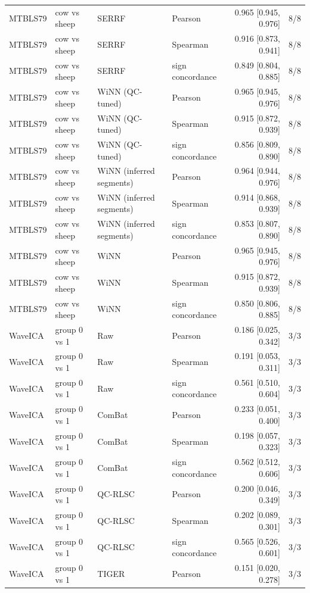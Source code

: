 \begin{landscape}
\begin{longtable}{llllrr}
MTBLS79 & cow vs sheep & SERRF & Pearson & 0.965 [0.945, 0.976] & 8/8 \\
MTBLS79 & cow vs sheep & SERRF & Spearman & 0.916 [0.873, 0.941] & 8/8 \\
MTBLS79 & cow vs sheep & SERRF & sign concordance & 0.849 [0.804, 0.885] & 8/8 \\
MTBLS79 & cow vs sheep & WiNN (QC-tuned) & Pearson & 0.965 [0.945, 0.976] & 8/8 \\
MTBLS79 & cow vs sheep & WiNN (QC-tuned) & Spearman & 0.915 [0.872, 0.939] & 8/8 \\
MTBLS79 & cow vs sheep & WiNN (QC-tuned) & sign concordance & 0.856 [0.809, 0.890] & 8/8 \\
MTBLS79 & cow vs sheep & WiNN (inferred segments) & Pearson & 0.964 [0.944, 0.976] & 8/8 \\
MTBLS79 & cow vs sheep & WiNN (inferred segments) & Spearman & 0.914 [0.868, 0.939] & 8/8 \\
MTBLS79 & cow vs sheep & WiNN (inferred segments) & sign concordance & 0.853 [0.807, 0.890] & 8/8 \\
MTBLS79 & cow vs sheep & WiNN & Pearson & 0.965 [0.945, 0.976] & 8/8 \\
MTBLS79 & cow vs sheep & WiNN & Spearman & 0.915 [0.872, 0.939] & 8/8 \\
MTBLS79 & cow vs sheep & WiNN & sign concordance & 0.850 [0.806, 0.885] & 8/8 \\
WaveICA & group 0 vs 1 & Raw & Pearson & 0.186 [0.025, 0.342] & 3/3 \\
WaveICA & group 0 vs 1 & Raw & Spearman & 0.191 [0.053, 0.311] & 3/3 \\
WaveICA & group 0 vs 1 & Raw & sign concordance & 0.561 [0.510, 0.604] & 3/3 \\
WaveICA & group 0 vs 1 & ComBat & Pearson & 0.233 [0.051, 0.400] & 3/3 \\
WaveICA & group 0 vs 1 & ComBat & Spearman & 0.198 [0.057, 0.323] & 3/3 \\
WaveICA & group 0 vs 1 & ComBat & sign concordance & 0.562 [0.512, 0.606] & 3/3 \\
WaveICA & group 0 vs 1 & QC-RLSC & Pearson & 0.200 [0.046, 0.349] & 3/3 \\
WaveICA & group 0 vs 1 & QC-RLSC & Spearman & 0.202 [0.089, 0.301] & 3/3 \\
WaveICA & group 0 vs 1 & QC-RLSC & sign concordance & 0.565 [0.526, 0.601] & 3/3 \\
WaveICA & group 0 vs 1 & TIGER & Pearson & 0.151 [0.020, 0.278] & 3/3 \\

\end{longtable}
\end{landscape}
